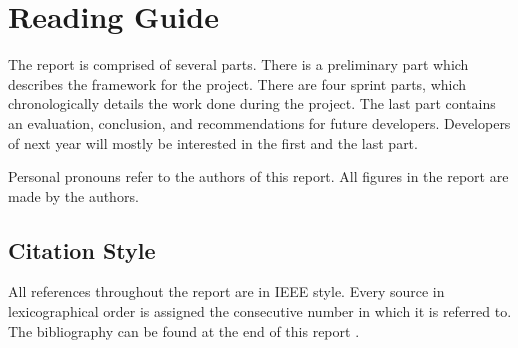 \chapter*{Reading Guide}
The report is comprised of several parts. There is a preliminary part which describes the framework for the project. There are four sprint parts, which chronologically details the work done during the project. The last part contains an evaluation, conclusion, and recommendations for future developers. Developers of next year will mostly be interested in the first and the last part.

Personal pronouns refer to the authors of this report. All figures in the report are made by the authors.

\section*{Citation Style}
All references throughout the report are in IEEE style. Every source in lexicographical order is assigned the consecutive number in which it is referred to. The bibliography can be found at the end of this report .



